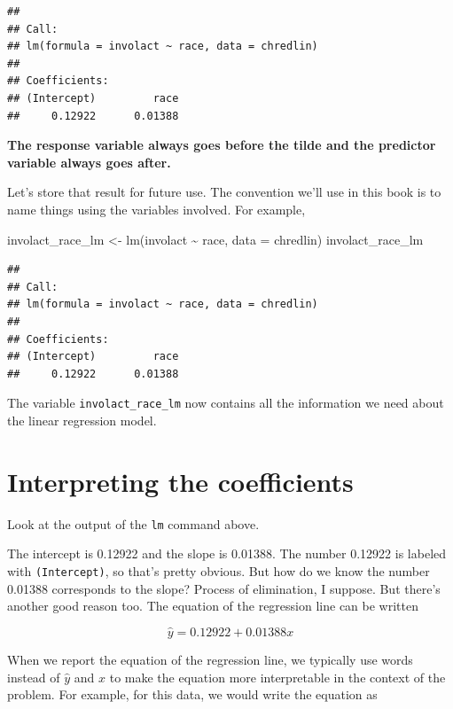 \documentclass[
]{book}
\newenvironment{Shaded}{\begin{snugshade}}{\end{snugshade}}
\newcommand{\AttributeTok}[1]{\textcolor[rgb]{0.77,0.63,0.00}{#1}}
\newcommand{\FunctionTok}[1]{\textcolor[rgb]{0.00,0.00,0.00}{#1}}
\newcommand{\NormalTok}[1]{#1}
\newcommand{\OtherTok}[1]{\textcolor[rgb]{0.56,0.35,0.01}{#1}}
\newcommand{\SpecialCharTok}[1]{\textcolor[rgb]{0.00,0.00,0.00}{#1}}
\begin{document}
\begin{verbatim}
## 
## Call:
## lm(formula = involact ~ race, data = chredlin)
## 
## Coefficients:
## (Intercept)         race  
##     0.12922      0.01388
\end{verbatim}

\textbf{The response variable always goes before the tilde and the predictor variable always goes after.}

Let's store that result for future use. The convention we'll use in this book is to name things using the variables involved. For example,

\begin{Shaded}
\begin{Highlighting}[]
\NormalTok{involact\_race\_lm }\OtherTok{\textless{}{-}} \FunctionTok{lm}\NormalTok{(involact }\SpecialCharTok{\textasciitilde{}}\NormalTok{ race, }\AttributeTok{data =}\NormalTok{ chredlin)}
\NormalTok{involact\_race\_lm}
\end{Highlighting}
\end{Shaded}

\begin{verbatim}
## 
## Call:
## lm(formula = involact ~ race, data = chredlin)
## 
## Coefficients:
## (Intercept)         race  
##     0.12922      0.01388
\end{verbatim}

The variable \texttt{involact\_race\_lm} now contains all the information we need about the linear regression model.

\hypertarget{regression-interpreting}{%
\section{Interpreting the coefficients}\label{regression-interpreting}}

Look at the output of the \texttt{lm} command above.

The intercept is 0.12922 and the slope is 0.01388. The number 0.12922 is labeled with \texttt{(Intercept)}, so that's pretty obvious. But how do we know the number 0.01388 corresponds to the slope? Process of elimination, I suppose. But there's another good reason too. The equation of the regression line can be written

\[
\hat{y} = 0.12922 + 0.01388 x
\]

When we report the equation of the regression line, we typically use words instead of \(\hat{y}\) and \(x\) to make the equation more interpretable in the context of the problem. For example, for this data, we would write the equation as
\end{document}
